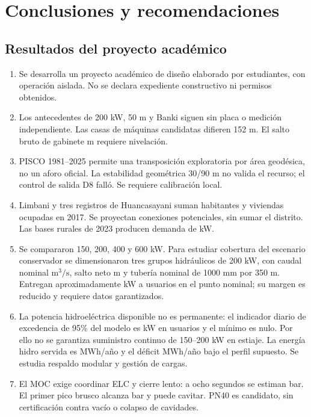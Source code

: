 \chapter{Conclusiones y recomendaciones}
\section{Resultados del proyecto académico}
\begin{enumerate}
\item Se desarrolla un proyecto académico de diseño elaborado por estudiantes, con operación aislada. No se declara expediente constructivo ni permisos obtenidos.
\item Los antecedentes de 200 kW, 50 m y Banki siguen sin placa o medición independiente. Las casas de máquinas candidatas difieren 152 m. El salto bruto de gabinete  m requiere nivelación.
\item PISCO 1981--2025 permite una transposición exploratoria por área geodésica, no un aforo oficial. La estabilidad geométrica 30/90 m no valida el recurso; el control de salida D8 falló. Se requiere calibración local.
\item Limbani y tres registros de Huancasayani suman  habitantes y  viviendas ocupadas en 2017. Se proyectan  conexiones potenciales, sin sumar el distrito. Las bases rurales de 2023 producen demanda de  kW.
\item Se compararon 150, 200, 400 y 600 kW. Para estudiar cobertura del escenario conservador se dimensionaron tres grupos hidráulicos de 200 kW, con caudal nominal  \(\mathrm{m^3/s}\), salto neto  m y tubería nominal de 1000 mm por 350 m. Entregan aproximadamente  kW a usuarios en el punto nominal; su margen es reducido y requiere datos garantizados.
\item La potencia hidroeléctrica disponible no es permanente: el indicador diario de excedencia de 95\% del modelo es  kW en usuarios y el mínimo es nulo. Por ello no se garantiza suministro continuo de 150--200 kW en estiaje. La energía hidro servida es  MWh/año y el déficit  MWh/año bajo el perfil supuesto. Se estudia respaldo modular y gestión de cargas.
\item El MOC exige coordinar ELC y cierre lento: a ocho segundos se estiman  bar. El primer pico brusco alcanza  bar y puede cavitar. PN40 es candidato, sin certificación contra vacío o colapso de cavidades.

\end{enumerate}
